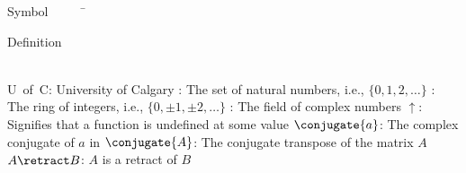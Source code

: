


\begin{tabbing}
Symbol~~~~~\= \ \ \ \ \ \ \ \ \ \ \ \ \ \ \ \ \ \ \ \ \ \ \ \ \ \ \ \ \ \ \ \ \ \ \ \  \parbox{5in}{Definition}\\

\addsymbol \mbox{U of C}: {University of Calgary}
\addsymbol \mbox{\nat}: {The set of natural numbers, i.e., $\{0,1,2,\ldots\}$}
\addsymbol \mbox{\integers}: {The ring of integers, i.e., $\{0,\pm1,\pm2,\ldots\}$}
\addsymbol \mbox{\complex}: {The field of complex numbers}
\addsymbol \mbox{$\uparrow$}: {Signifies that a function is undefined at some value}
\addsymbol \mbox{$\conjugate{a}$}: {The complex conjugate of $a$ in \complex}
\addsymbol \mbox{$\conjugate{A}$}: {The conjugate transpose of the matrix $A$}
\addsymbol \mbox{$A\retract B$}: {$A$ is a retract of $B$}
\end{tabbing}

